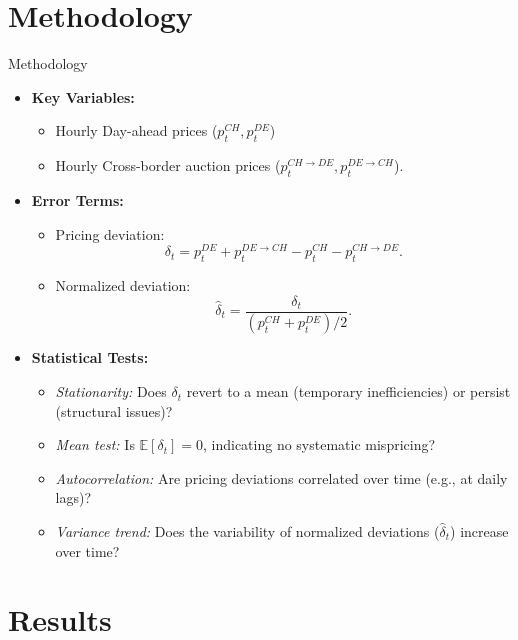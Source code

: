 \documentclass[aspectratio=169,xcolor=dvipsnames]{beamer}
\begin{document}
\section{Methodology}
\begin{frame}{Methodology}
\begin{itemize}
    \item \textbf{Key Variables:}
    \begin{itemize}
        \item Hourly Day-ahead prices (\( p_t^{CH}, p_t^{DE} \)) 
        \item Hourly Cross-border auction prices (\( p_t^{CH \rightarrow DE}, p_t^{DE \rightarrow CH} \)).
    \end{itemize}
    \item \textbf{Error Terms:}
    \begin{itemize}
        \item Pricing deviation: 
        \[
        \delta_t = p_t^{DE} + p_t^{DE \rightarrow CH} - p_t^{CH} - p_t^{CH \rightarrow DE}.
        \]
        \item Normalized deviation: 
        \[
        \hat{\delta}_t = \frac{\delta_t}{(p_t^{CH} + p_t^{DE})/2}.
        \]
    \end{itemize}
    \item \textbf{Statistical Tests:}
    \begin{itemize}
        \item \textit{Stationarity:} Does $\delta_t$ revert to a mean (temporary inefficiencies) or persist (structural issues)?
        \item \textit{Mean test:} Is $\mathbb{E}[\delta_t] = 0$, indicating no systematic mispricing?
        \item \textit{Autocorrelation:} Are pricing deviations correlated over time (e.g., at daily lags)?
        \item \textit{Variance trend:} Does the variability of normalized deviations ($\hat{\delta}_t$) increase over time?
    \end{itemize}
\end{itemize}
\end{frame}

\section{Results}
\end{document}
